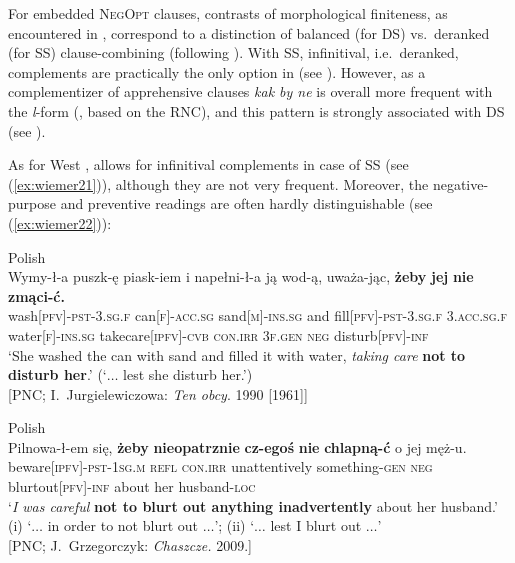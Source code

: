 \documentclass[output=paper,colorlinks,citecolor=brown]{langscibook}
\begin{document}
 For embedded \textsc{NegOpt} clauses, contrasts of morphological finiteness, as encountered in , correspond to a distinction of balanced (for DS) vs.\ deranked (for SS) clause-combining (following \citealt{Cristofaro2003}). With SS, infinitival, i.e.\ de\-ranked, complements are practically the only option in  (see ). However, as a complementizer of apprehensive clauses \textit{kak by ne} is overall more frequent with the \textit{l}-form (\citealt[338]{Dobrushina2016}, based on the RNC), and this pattern is strongly associated with DS (see ).

As for West ,  allows for infinitival complements in case of SS (see (\ref{ex:wiemer21})), although they are not very frequent. Moreover, the negative-purpose and preventive readings are often hardly distinguishable (see (\ref{ex:wiemer22})):


\ea \textnormal{Polish}\\
\label{ex:wiemer21} 
\gll Wymy-ł-a puszk-ę piask-iem i napełni-ł-a ją wod-ą, uważa-jąc, \textbf{żeby} \textbf{jej} \textbf{nie} \textbf{zmąci-ć.} \\
wash\textsc{[pfv]-pst-3.sg.f} can\textsc{[f]-acc.sg} sand\textsc{[m]-ins.sg} and fill\textsc{[pfv]-pst-3.sg.f} \textsc{3.acc.sg.f} water\textsc{[f]-ins.sg} take\textunderscore care\textsc{[ipfv]-cvb} \textsc{con.irr} \textsc{3f.gen} \textsc{neg} disturb\textsc{[pfv]-inf} \\
\glt `She washed the can with sand and filled it with water, \textit{taking care} \textbf{not to disturb her}.' (`$\ldots$  lest she disturb her.')\\
 {[PNC; I.\ Jurgielewiczowa: \textit{Ten obcy}. 1990 [1961]]}
\z



\begin{exe} \ex\textnormal{Polish}
\label{ex:wiemer22} \\
\gll Pilnowa-ł-em się, \textbf{żeby} \textbf{nieopatrznie} \textbf{cz-ego{\' s}} \textbf{nie} \textbf{chlapną-ć} o jej męż-u. \\
beware\textsc{[ipfv]-pst-1sg.m} \textsc{refl} \textsc{con.irr} unattentively something-\textsc{gen} \textsc{neg} blurt\textunderscore out\textsc{[pfv]-inf} about her husband-\textsc{loc} \\
\glt `\textit{I was careful} \textbf{not to blurt out anything inadvertently} about her husband.' \\
(i) `$\ldots$  in order to not blurt out $\ldots$'; (ii) `$\ldots$ lest I blurt out $\ldots$'\\ {[PNC; J.\ Grzegorczyk: \textit{Chaszcze.} 2009.]}
\end{exe}
\end{document}
